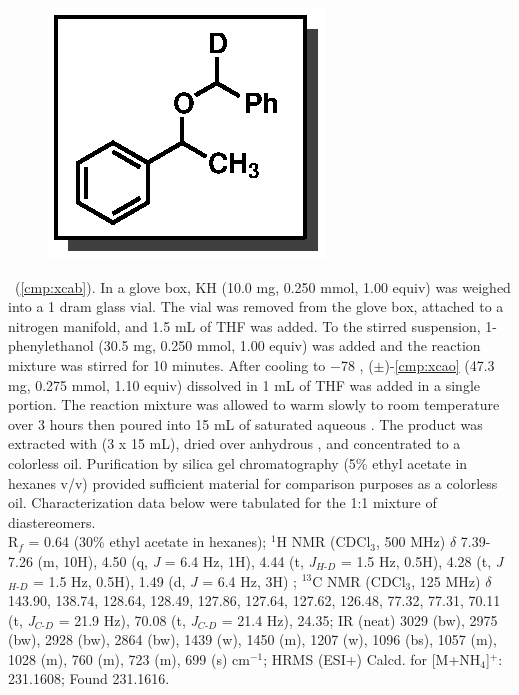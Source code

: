 \begin{figure}
  \vspace{-22pt}
  \begin{center}
    \includegraphics[scale=0.8]{chp_alkylation/images/xcab}
  \end{center}
  \vspace{-35pt}
\end{figure}
\noindent \textbf{\CMPxcab}\ (\ref{cmp:xcab}). In a glove box, KH (10.0 mg, 0.250 mmol, 1.00
equiv) was weighed into a 1 dram glass vial. The vial was removed from the glove box,
attached to a nitrogen manifold, and 1.5 mL of THF was added. To the stirred
suspension, 1-phenylethanol (30.5 mg, 0.250 mmol, 1.00 equiv) was added and the reaction mixture was
stirred for 10 minutes. After cooling to $-$78 \degc, ($\pm$)-\ref{cmp:xcao} (47.3 mg, 0.275 mmol, 1.10 equiv) dissolved in 1 mL of THF was
added in a single portion. The reaction mixture was allowed to warm slowly to room temperature
over 3 hours then poured into 15 mL of saturated aqueous . The product was extracted with
 (3 x 15 mL), dried over anhydrous , and concentrated to a colorless oil.
Purification by silica gel chromatography (5\% ethyl acetate in hexanes v/v) provided sufficient
material for comparison purposes as a colorless oil. Characterization data below were tabulated for the
1:1 mixture of diastereomers.
\\
R$_f$ = 0.64 (30\% ethyl acetate in hexanes); 
$^1$H NMR (CDCl$_3$, 500 MHz) $\delta$ 7.39-7.26 (m, 10H), 4.50 (q, \textit{J} = 6.4 Hz, 1H), 4.44
(t, \textit{J}$_{H\mbox{-}D}$ = 1.5 Hz, 0.5H), 4.28 (t, \textit{J}$_{H\mbox{-}D}$ = 1.5 Hz, 0.5H),
1.49 (d, \textit{J} = 6.4 Hz, 3H) ; $^{13}$C NMR (CDCl$_3$, 125 MHz) $\delta$ 143.90, 138.74,
128.64, 128.49, 127.86, 127.64, 127.62, 126.48, 77.32, 77.31, 70.11 (t, \textit{J}$_{C\mbox{-}D}$ = 21.9 Hz), 70.08 (t,
\textit{J}$_{C\mbox{-}D}$ = 21.4 Hz), 24.35; IR (neat) 3029 (bw), 2975 (bw), 2928 (bw),
2864 (bw), 1439 (w), 1450 (m), 1207 (w), 1096 (bs), 1057 (m), 1028 (m), 760 (m), 723 (m),
699 (s) cm$^{-1}$; HRMS (ESI+) Calcd.
for  [M+NH$_4$]$^+$:
231.1608; Found 231.1616.


